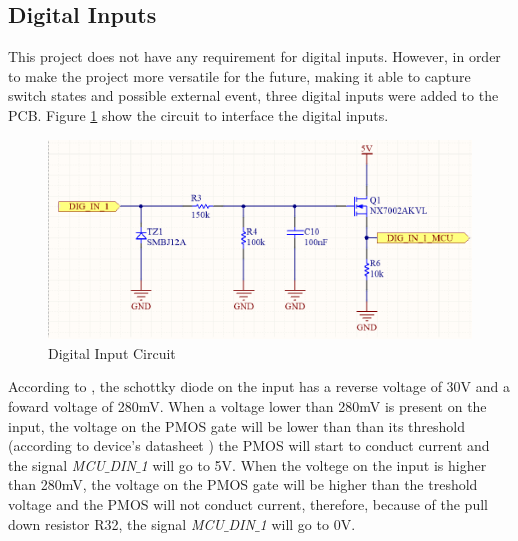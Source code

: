 	\subsection{Digital Inputs}\label{ssec:digital-inputs}

		This project does not have any requirement for digital inputs. However, in order to make the project more versatile for the future, making it able to capture switch states and possible external event, three digital inputs were added to the PCB. Figure \ref{fig:digital-input-circuit} show the circuit to interface the digital inputs.

			\begin{figure}[htbp]
				\centering
				\includegraphics[width=.8\textwidth]{figuras/fig-digital-input-circuit}
				\caption{Digital Input Circuit}
				\label{fig:digital-input-circuit}
			\end{figure}

		According to \cite{RB751V40T1-datasheet}, the schottky diode on the input has a reverse voltage of 30V and a foward voltage of 280mV. When a voltage lower than 280mV is present on the input, the voltage on the PMOS gate will be lower than than its threshold (according to device's datasheet \cite{RU1C002ZP-datasheet}) the PMOS will start to conduct current and the signal \textit{MCU$\_$DIN$\_$1} will go to 5V. When the voltege on the input is higher than 280mV, the voltage on the PMOS gate will be higher than the treshold voltage and the PMOS will not conduct current, therefore, because of the pull down resistor R32, the signal \textit{MCU$\_$DIN$\_$1} will go to 0V.